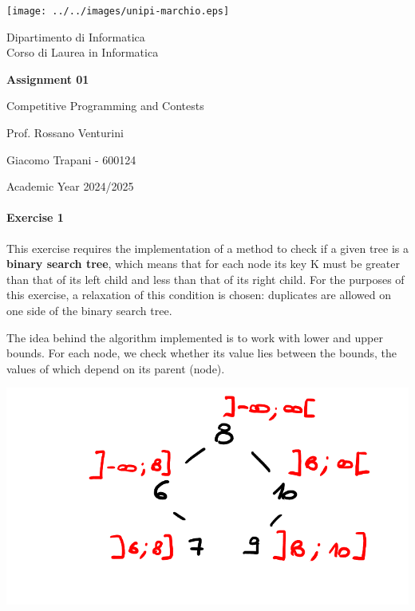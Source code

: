 \documentclass[12pt]{report}
\theoremstyle{definition}
\theoremstyle{definition}
\begin{document}
\begin{titlepage}
	\clearpage\thispagestyle{empty}
	\centering
	\vspace{1cm}

	\texttt{[image: ../../images/unipi-marchio.eps]}

	{\normalsize \noindent Dipartimento di Informatica \\
			Corso di Laurea in Informatica \par}
	
	\vspace{2cm}
	{\huge \textbf{Assignment 01} \par }
	\vspace{1cm}
	{\large Competitive Programming and Contests}

	\vspace{3cm}

	\begin{minipage}[t]{0.47\textwidth}
		{\large{Prof. Rossano Venturini}}
	\end{minipage}\hfill\begin{minipage}[t]{0.47\textwidth}\raggedleft
		{\large {Giacomo Trapani - 600124}}
	\end{minipage}

	\vspace{3cm}

	{\normalsize Academic Year 2024/2025 \par}

	\pagebreak
\end{titlepage}
\paragraph*{Exercise 1}
This exercise requires the implementation of a method to check if a given tree
is a \textbf{binary search tree}, which means that for each node its key K must
be greater than that of its left child and less than that of its
right child. For the purposes of this exercise, a relaxation of this condition is
chosen: duplicates are allowed on one side of the binary search tree.

The idea behind the algorithm implemented is to work with lower and upper bounds. For
each node, we check whether its value lies between the bounds, the values of which depend
on its parent (node).

\includegraphics[scale=0.4]{./images/ex1-range-sample.png}
\end{document}
